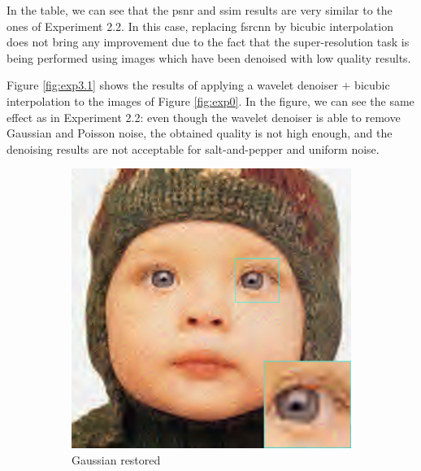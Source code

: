 In the table, we can see that the \gls{psnr} and \gls{ssim} results are very similar to the ones of Experiment 2.2. In this case, replacing \gls{fsrcnn} by bicubic interpolation does not bring any improvement due to the fact that the super-resolution task is being performed using images which have been denoised with low quality results.

Figure \ref{fig:exp3.1} shows the results of applying a wavelet denoiser $+$ bicubic interpolation to the images of Figure \ref{fig:exp0}. In the figure, we can see the same effect as in Experiment 2.2: even though the wavelet denoiser is able to remove Gaussian and Poisson noise, the obtained quality is not high enough, and the denoising results are not acceptable for salt-and-pepper and uniform noise.

\begin{figure}
	\centering
	\begin{subfigure}{0.24\textwidth}
		\includegraphics[width=\textwidth]{images/exp3.1/gaussian.png}
		\caption{Gaussian restored}
	\end{subfigure}
	\begin{subfigure}{0.24\textwidth}

\end{subfigure}
\end{figure}

